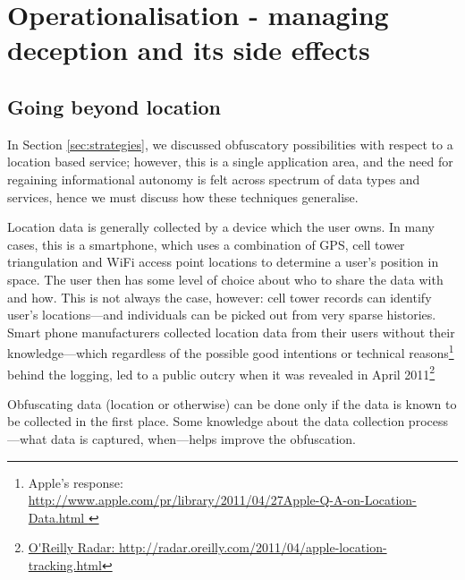 \documentclass{IOS-Book-Article}     %
\begin{document}
\section{Operationalisation - managing deception and its side effects}

\subsection{Going beyond location}

In Section \ref{sec:strategies}, we discussed obfuscatory possibilities with
respect to a location based service; however, this is a single application area,
and the need for regaining informational autonomy is felt across spectrum of
data types and services, hence we must discuss how these techniques generalise.

Location data is generally collected by a device which the user owns. In many
cases, this is a smartphone, which uses a combination of GPS, cell tower
triangulation and WiFi access point locations to determine a user's position in
space. The user then has some level of choice about who to share the data with
and how. This is not always the case, however: cell tower records can identify
user's locations---and individuals can be picked out from very sparse
histories\cite{montjoye2013Unique}. Smart phone manufacturers collected 
location data from their users without their knowledge---which regardless of the 
possible good intentions or technical reasons\footnote{Apple's response:\\\url{http://www.apple.com/pr/library/2011/04/27Apple-Q-A-on-Location-Data.html 
}} behind the logging, led to a public outcry when it was revealed in April 
2011\footnote{\url{O'Reilly Radar: http://radar.oreilly.com/2011/04/apple-location-tracking.html}
}

Obfuscating data (location or otherwise) can be done only if the data is 
known to be collected in the first place. Some knowledge about the data 
collection process---what data is captured, when---helps improve the obfuscation. 
\end{document}

